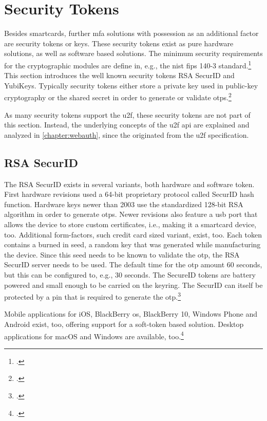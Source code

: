 \section{Security Tokens}

Besides smartcards, further \gls{mfa} solutions with possession as an additional factor are security tokens or keys. These security tokens exist as pure hardware solutions, as well as software based solutions. The minimum security requirements for the cryptographic modules are define in, e.g., the \gls{nist} \gls{fips} 140-3 standard.\footcites[See][]{FIPS140-3} This section introduces the well known security tokens \frqq RSA SecurID\flqq{} and \frqq YubiKeys\flqq. Typically security tokens either store a private key used in public-key cryptography or the shared secret in order to generate or validate \glspl{otp}.\footcites[See][Chapter 28.4.3]{1174011}

As many security tokens support the \gls{u2f}, these security tokens are not part of this section. Instead, the underlying concepts of the \gls{u2f} \gls{api} are explained and analyzed in \autoref{chapter:webauth}, since the \wa{} originated from the \gls{u2f} specification.

\subsection{RSA SecurID}

The RSA SecurID exists in several variants, both hardware and software token. First hardware revisions used a 64-bit proprietary protocol called \frqq SecurID hash function\flqq. Hardware keys newer than 2003 use the standardized 128-bit RSA algorithm in order to generate \glspl{otp}. Newer revisions also feature a \gls{usb} port that allows the device to store custom certificates, i.e., making it a smartcard device, too. Additional form-factors, such credit card sized variant, exist, too. Each token contains a burned in seed, a random key that was generated while manufacturing the device. Since this seed needs to be known to validate the \gls{otp}, the RSA SecurID server needs to be used. The default time for the \gls{otp} amount 60 seconds, but this can be configured to, e.g., 30 seconds. The SecureID tokens are battery powered and small enough to be carried on the keyring. The SecurID can itself be protected by a \gls{pin} that is required to generate the \gls{otp}.\footcites[See][479--480]{eckert-it-sec-9}[See][296]{4351500}

Mobile applications for iOS, BlackBerry \gls{os}, BlackBerry 10, Windows Phone and Android exist, too, offering support for a soft-token based solution. Desktop applications for macOS and Windows are available, too.\footcites[See][3--6]{ibm-mfa}[See][49]{5542954}

